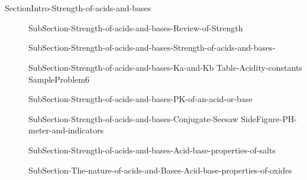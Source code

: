 \documentclass[main.tex]{subfiles}
\begin{document}
\section{\color{blue!30!black}{Strength of acids and bases}}{SectionIntro-Strength-of-acids-and-bases}
\sloppy\begin{description}
\item[] {SubSection-Strength-of-acids-and-bases-Review-of-Strength}
\item[] {SubSection-Strength-of-acids-and-bases-Strength-of-acids-and-bases-}
\item[] {SubSection-Strength-of-acids-and-bases-Ka-and-Kb}
  \newpage\hspace{4cm}  {Table-Acidity-constants}
   {SampleProblem6}
   \item[] {SubSection-Strength-of-acids-and-bases-PK-of-an-acid-or-base}
   \item[] {SubSection-Strength-of-acids-and-bases-Conjugate-Seesaw}
    {SideFigure-PH-meter-and-indicators}
   \item[] {SubSection-Strength-of-acids-and-bases-Acid-base-properties-of-salts}
      \item[] {SubSection-The-nature-of-acids-and-Bases-Acid-base-properties-of-oxides}
\end{description}
\end{document}
